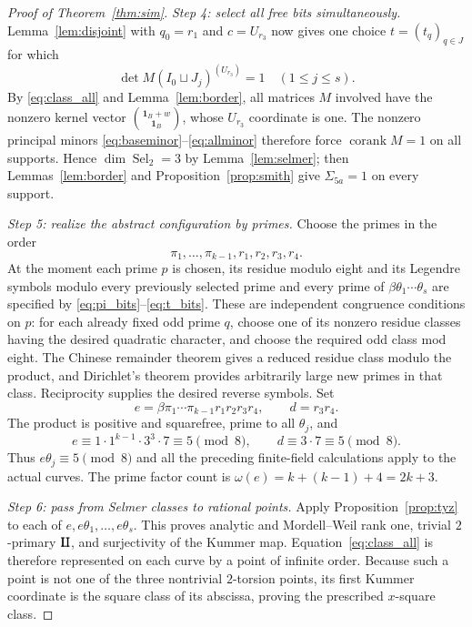 \documentclass[11pt,a4paper]{article}
\theoremstyle{definition}
\newcommand{\corank}{\operatorname{corank}}
\newcommand{\Sel}{\operatorname{Sel}_2}
\newcommand{\Sha}{\operatorname{\mathrlap{\mathchoice{\raisebox{.13ex}{$\displaystyle\amalg$}}{\raisebox{.13ex}{$\textstyle\amalg$}}{\amalg}{\amalg}}\amalg}}
\newcommand{\one}{\boldsymbol{1}}
\begin{document}
\begin{proof}[Proof of Theorem~\ref{thm:sim}]
\emph{Step 4: select all free bits simultaneously.}
Lemma~\ref{lem:disjoint} with $q_0=r_1$ and
$c=U_{r_3}$ now gives one choice
$t=(t_q)_{q\in J}$ for which
\begin{equation}\label{eq:allminor}
 \det M(I_0\sqcup J_j)^{(U_{r_3})}=1
                         \quad(1\le j\le s).
\end{equation}
By \eqref{eq:class_all} and Lemma~\ref{lem:border},
all matrices $M$ involved have the nonzero kernel vector
\(\binom{\one_B+w}{\one_B}\), whose $U_{r_3}$ coordinate
is one.  The nonzero principal minors
\eqref{eq:baseminor}--\eqref{eq:allminor} therefore
force $\corank M=1$ on all supports.  Hence
\(\dim\Sel=3\) by Lemma~\ref{lem:selmer}; then
Lemmas~\ref{lem:border} and Proposition~\ref{prop:smith}
give $\Sigma_{5a}=1$ on every support.

\emph{Step 5: realize the abstract configuration by primes.}
Choose the primes in the order
\[
                  \pi_1,\ldots,\pi_{k-1},
                  r_1,r_2,r_3,r_4.
\]
At the moment each prime $p$ is chosen, its residue
modulo eight and its Legendre symbols modulo every
previously selected prime and every prime of
$\beta\theta_1\cdots\theta_s$ are specified by
\eqref{eq:pi_bits}--\eqref{eq:t_bits}.
These are independent congruence conditions on $p$:
for each already fixed odd prime $q$, choose one of its
nonzero residue classes having the desired quadratic
character, and choose the required odd class mod eight.
The Chinese remainder theorem gives a reduced residue
class modulo the product, and Dirichlet's theorem provides
arbitrarily large new primes in that class.  Reciprocity
supplies the desired reverse symbols.
Set
\[
          e=\beta\pi_1\cdots\pi_{k-1}r_1r_2r_3r_4,
                  \qquad d=r_3r_4.
\]
The product is positive and squarefree, prime to all
$\theta_j$, and
\[
 e\equiv 1\cdot1^{k-1}\cdot3^3\cdot7
        \equiv5\pmod8,\qquad
 d\equiv3\cdot7\equiv5\pmod8.
\]
Thus $e\theta_j\equiv5\pmod8$ and all the preceding
finite-field calculations apply to the actual curves.
The prime factor count is
$\omega(e)=k+(k-1)+4=2k+3$.

\emph{Step 6: pass from Selmer classes to rational points.}
Apply Proposition~\ref{prop:tyz} to each of
$e,e\theta_1,\ldots,e\theta_s$.
This proves analytic and Mordell--Weil rank one,
trivial $2$-primary $\Sha$, and surjectivity of the
Kummer map.  Equation~\eqref{eq:class_all} is therefore
represented on each curve by a point of infinite order.
Because such a point is not one of the three nontrivial
$2$-torsion points, its first Kummer coordinate is the
square class of its abscissa, proving the prescribed
$x$-square class.


\end{proof}
\end{document}
